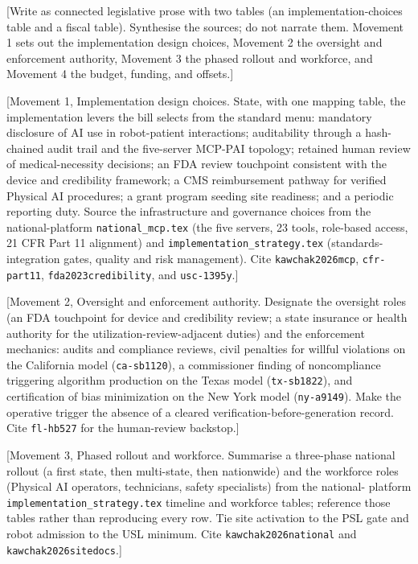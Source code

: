 
[Write as connected legislative prose with two tables (an implementation-choices
table and a fiscal table). Synthesise the sources; do not narrate them. Movement 1
sets out the implementation design choices, Movement 2 the oversight and
enforcement authority, Movement 3 the phased rollout and workforce, and Movement 4
the budget, funding, and offsets.]

[Movement 1, Implementation design choices. State, with one mapping table, the
implementation levers the bill selects from the standard menu: mandatory
disclosure of AI use in robot-patient interactions; auditability through a hash-
chained audit trail and the five-server MCP-PAI topology; retained human review of
medical-necessity decisions; an FDA review touchpoint consistent with the device
and credibility framework; a CMS reimbursement pathway for verified Physical AI
procedures; a grant program seeding site readiness; and a periodic reporting duty.
Source the infrastructure and governance choices from the national-platform
\texttt{national\_mcp.tex} (the five servers, 23 tools, role-based access, 21 CFR
Part 11 alignment) and \texttt{implementation\_strategy.tex} (standards-integration
gates, quality and risk management). Cite \texttt{kawchak2026mcp},
\texttt{cfr-part11}, \texttt{fda2023credibility}, and \texttt{usc-1395y}.]

[Movement 2, Oversight and enforcement authority. Designate the oversight roles
(an FDA touchpoint for device and credibility review; a state insurance or health
authority for the utilization-review-adjacent duties) and the enforcement
mechanics: audits and compliance reviews, civil penalties for willful violations
on the California model (\texttt{ca-sb1120}), a commissioner finding of
noncompliance triggering algorithm production on the Texas model
(\texttt{tx-sb1822}), and certification of bias minimization on the New York model
(\texttt{ny-a9149}). Make the operative trigger the absence of a cleared
verification-before-generation record. Cite \texttt{fl-hb527} for the human-review
backstop.]

[Movement 3, Phased rollout and workforce. Summarise a three-phase national
rollout (a first state, then multi-state, then nationwide) and the workforce roles
(Physical AI operators, technicians, safety specialists) from the national-
platform \texttt{implementation\_strategy.tex} timeline and workforce tables;
reference those tables rather than reproducing every row. Tie site activation to
the PSL gate and robot admission to the USL minimum. Cite \texttt{kawchak2026national}
and \texttt{kawchak2026sitedocs}.]

